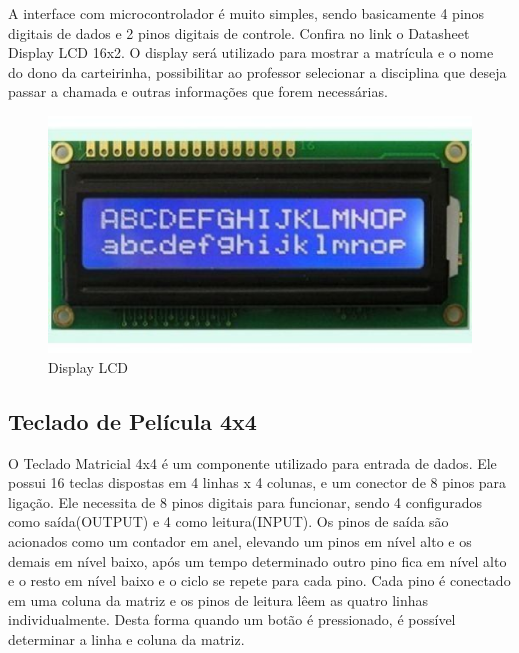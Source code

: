 A interface com microcontrolador é muito simples, sendo basicamente 4 pinos digitais de dados e 2 pinos digitais de controle. Confira no link o Datasheet Display LCD 16x2. O display será utilizado para mostrar a matrícula e o nome do dono da carteirinha, possibilitar ao professor selecionar a disciplina que deseja passar a chamada e outras informações que forem necessárias.

\begin{figure}[!h]
  \centering
  \includegraphics[keepaspectratio=true,scale=0.45]{figuras/lcd.eps}
  \caption{Display LCD}
\end{figure}

\pagebreak

\subsection{Teclado de Película 4x4}
O Teclado Matricial 4x4 é um componente utilizado para entrada de dados. Ele possui 16 teclas dispostas em 4 linhas x 4 colunas, e um conector de 8 pinos para ligação. Ele necessita de 8 pinos digitais para funcionar, sendo 4 configurados como saída(OUTPUT) e 4 como leitura(INPUT). Os pinos de saída são acionados como um contador em anel, elevando um pinos em nível alto e os demais em nível baixo, após um tempo determinado outro pino fica em nível alto e o resto em nível baixo e o ciclo se repete para cada pino. Cada pino é conectado em uma coluna da matriz e os pinos de leitura lêem as quatro linhas individualmente. Desta forma quando um botão é pressionado,  é possível determinar a linha e coluna da matriz.

